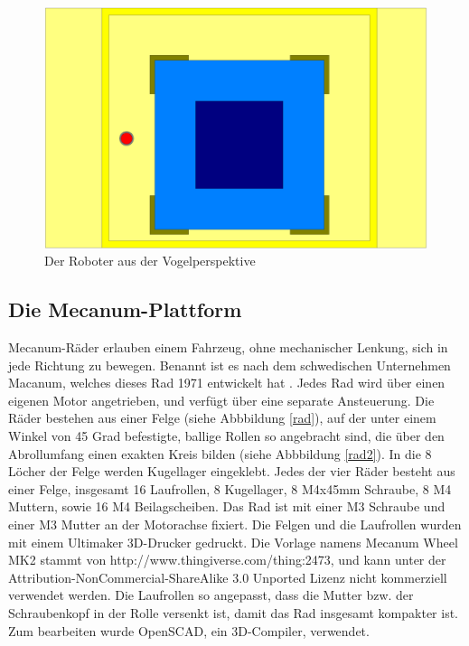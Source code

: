 \documentclass[a4paper,bibtotoc,oneside]{scrbook}
\begin{document}
\begin{figure}[htbp]
\centering
\includegraphics[width=125mm]{img/oben2.png}
\caption{Der Roboter aus der Vogelperspektive}\label{oben}
\end{figure}
  

\subsection{Die Mecanum-Plattform}\thispagestyle{empty}
Mecanum-Räder erlauben einem Fahrzeug, ohne mechanischer Lenkung, sich in jede Richtung zu bewegen. Benannt ist es nach dem schwedischen Unternehmen Macanum, welches dieses Rad 1971 entwickelt hat \cite{mecanum}. 
Jedes Rad wird über einen eigenen Motor angetrieben, und verfügt über eine separate Ansteuerung. Die Räder bestehen aus einer Felge (siehe Abbbildung \ref{rad}), auf der unter einem Winkel von 45 Grad befestigte, ballige Rollen so angebracht sind, die über den Abrollumfang einen exakten Kreis bilden (siehe Abbbildung \ref{rad2}). In die 8 Löcher der Felge werden Kugellager eingeklebt. Jedes der vier Räder besteht aus einer Felge, insgesamt 16 Laufrollen, 8 Kugellager, 8 M4x45mm Schraube, 8 M4 Muttern, sowie 16 M4 Beilagscheiben. 
Das Rad ist mit einer M3 Schraube und einer M3 Mutter an der Motorachse fixiert.
Die Felgen und die Laufrollen wurden mit einem Ultimaker 3D-Drucker gedruckt. 
Die Vorlage namens Mecanum Wheel MK2 stammt von http://www.thingiverse.com/thing:2473, und kann unter der Attribution-NonCommercial-ShareAlike 3.0 Unported Lizenz nicht kommerziell verwendet werden.
Die Laufrollen so angepasst, dass die Mutter bzw. der Schraubenkopf in der Rolle versenkt ist, damit das Rad insgesamt kompakter ist. Zum bearbeiten wurde OpenSCAD, ein 3D-Compiler, verwendet. 
\end{document}
